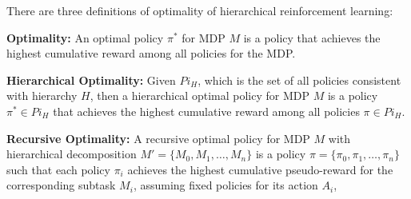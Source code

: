 There are three definitions of optimality of hierarchical reinforcement learning:

\begin{definition}
    \textbf{Optimality:} An optimal policy $\pi^*$ for MDP $M$ is a policy that achieves the highest cumulative reward
    among all policies for the MDP.
\end{definition}
\begin{definition}
    \textbf{Hierarchical Optimality:} Given $Pi_H$, which is the set of all policies consistent with hierarchy $H$, 
    then a hierarchical optimal policy for MDP $M$ is a policy $\pi^* \in Pi_H$ that achieves the highest cumulative reward
    among all policies $\pi \in Pi_H$.
\end{definition}
\begin{definition}
    \textbf{Recursive Optimality:} A recursive optimal policy for MDP $M$ with hierarchical 
    decomposition $M' = \{M_0, M_1, \dots, M_n\}$ is a policy $\pi = \{\pi_0, \pi_1, \dots, \pi_n\}$ such
    that each policy $\pi_i$ achieves the highest cumulative pseudo-reward for the corresponding subtask $M_i$,
    assuming fixed policies for its action $A_i$, 
\end{definition}


